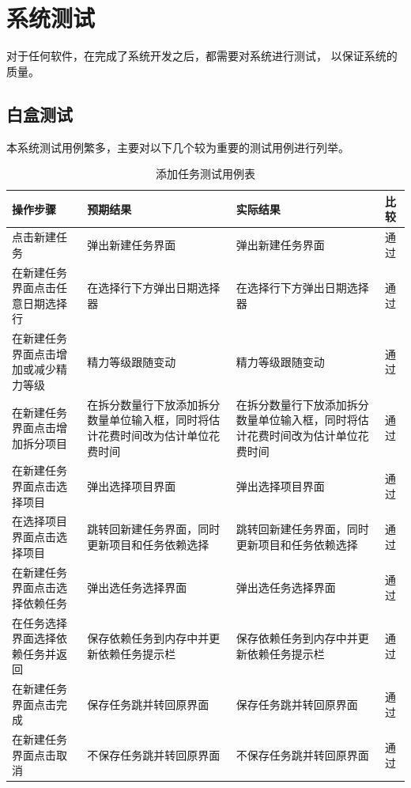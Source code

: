 
\chapter{系统测试}

对于任何软件，在完成了系统开发之后，都需要对系统进行测试，
以保证系统的质量。

\section{白盒测试}
本系统测试用例繁多，主要对以下几个较为重要的测试用例进行列举。
\begin{table}
	\centering
	\caption{添加任务测试用例表}
	\begin{tabular}{p{3cm}p{3cm}p{3cm}p{3cm}} \toprule
	  操作步骤 & 预期结果 & 实际结果 & 比较 \\
	  \midrule
	  点击新建任务 & 弹出新建任务界面 & 弹出新建任务界面 & 通过 \\ \midrule
	  在新建任务界面点击任意日期选择行 & 在选择行下方弹出日期选择器 & 在选择行下方弹出日期选择器 & 通过 \\ \midrule
	  在新建任务界面点击增加或减少精力等级 & 精力等级跟随变动 & 精力等级跟随变动 & 通过 \\ \midrule
	  在新建任务界面点击增加拆分项目 & 在拆分数量行下放添加拆分数量单位输入框，同时将估计花费时间改为估计单位花费时间 & 在拆分数量行下放添加拆分数量单位输入框，同时将估计花费时间改为估计单位花费时间 & 通过 \\ \midrule
	  在新建任务界面点击选择项目 & 弹出选择项目界面 & 弹出选择项目界面 & 通过 \\ \midrule
	  在选择项目界面点击选择项目 & 跳转回新建任务界面，同时更新项目和任务依赖选择 & 跳转回新建任务界面，同时更新项目和任务依赖选择 & 通过 \\ \midrule
	  在新建任务界面点击选择依赖任务 & 弹出选任务选择界面 & 弹出选任务选择界面 & 通过 \\ \midrule
	  在任务选择界面选择依赖任务并返回 & 保存依赖任务到内存中并更新依赖任务提示栏 & 保存依赖任务到内存中并更新依赖任务提示栏 & 通过 \\ \midrule
	  在新建任务界面点击完成 & 保存任务跳并转回原界面 & 保存任务跳并转回原界面 & 通过 \\ \midrule
	  在新建任务界面点击取消 & 不保存任务跳并转回原界面 & 不保存任务跳并转回原界面 & 通过 \\ \midrule
	  \bottomrule
	\end{tabular}
\end{table}

